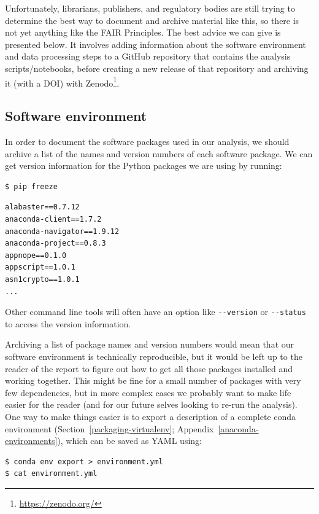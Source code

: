 \documentclass[
]{krantz}
\renewcommand{\href}[2]{#2\footnote{\url{#1}}}
\begin{document}
Unfortunately,
librarians, publishers, and regulatory bodies are still trying to determine
the best way to document and archive material like this,
so there is not yet anything like the FAIR Principles.
The best advice we can give is presented below.
It involves adding information about the software environment
and data processing steps to a GitHub repository that contains
the analysis scripts/notebooks,
before creating a new release of that repository and archiving it (with a DOI)
with \href{https://zenodo.org/}{Zenodo}.

\hypertarget{provenance-code-environment}{%
\subsection{Software environment}\label{provenance-code-environment}}

In order to document the software packages used in our analysis,
we should archive a list of the names and version numbers of each software package.
We can get version information for the Python packages we are using by running:

\begin{verbatim}
$ pip freeze
\end{verbatim}

\begin{verbatim}
alabaster==0.7.12
anaconda-client==1.7.2
anaconda-navigator==1.9.12
anaconda-project==0.8.3
appnope==0.1.0
appscript==1.0.1
asn1crypto==1.0.1
...
\end{verbatim}

Other command line tools will often have an option like \texttt{-\/-version} or \texttt{-\/-status}
to access the version information.

Archiving a list of package names and version numbers would mean that our
software environment is technically reproducible,
but it would be left up to the reader of the report
to figure out how to get all those packages installed and working together.
This might be fine for a small number of packages with very few dependencies,
but in more complex cases we probably want to make life easier for the reader
(and for our future selves looking to re-run the analysis).
One way to make things easier is to export a description of
a complete conda environment (Section~\ref{packaging-virtualenv};
Appendix~\ref{anaconda-environments}),
which can be saved as YAML using:

\begin{verbatim}
$ conda env export > environment.yml
$ cat environment.yml
\end{verbatim}
\end{document}
